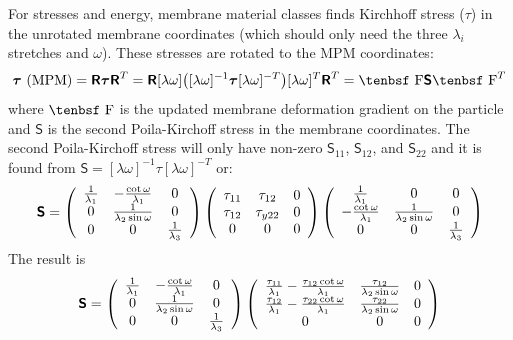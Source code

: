 \documentclass[11pt]{book}
\newcommand{\tens}[1]{\boldsymbol{\mathsf{#1}}}
\def\F{\hbox{\tenbsf F}}
\begin{document}
For stresses and energy, membrane material classes finds Kirchhoff stress ($\tens{\tau}$) in the unrotated membrane coordinates (which should only need the three $\lambda_i$ stretches and $\omega$). These stresses are rotated to the MPM coordinates:
\begin{equation}
    \tens\tau\ ({\rm MPM}) = \tens{R} \tens{\tau} \tens{R}^T =  \tens{R}[\lambda\omega]\bigl([\lambda\omega]^{-1} \tens{\tau}[\lambda\omega]^{-T}\bigr)[\lambda\omega]^T\tens{R}^T =  \F \tens{S} \F^T
\end{equation}
where $\F$ is the updated membrane deformation gradient on the particle and $\tens{S}$ is the second Poila-Kirchoff stress in the membrane coordinates. The second Poila-Kirchoff stress will only have non-zero $\tens{S}_{11}$, $\tens{S}_{12}$, and $\tens{S}_{22}$ and it is found from $\tens{S} =  [\lambda\omega]^{-1} \tens{\tau}[\lambda\omega]^{-T}$ or:
\begin{equation}
   \tens{S} = \left(\begin{array}{ccc}
          {1\over\lambda_1}  & -{ \cot\omega\over \lambda_1} & 0   \\
         0  & {1\over \lambda_2 \sin\omega} & 0   \\
        0 & 0 & {1\over\lambda_3}
        \end{array}\right)\left(\begin{array}{ccc}
          \tau_{11}  & \tau_{12} & 0   \\
         \tau_{12}  & \tau_{y22} & 0   \\
        0 & 0 & 0
        \end{array}\right)\left(\begin{array}{ccc}
          {1\over\lambda_1}  & 0 & 0   \\
         -{ \cot\omega\over \lambda_1}  & {1\over \lambda_2 \sin\omega} & 0   \\
        0 & 0 & {1\over\lambda_3}
        \end{array}\right)
\end{equation}
The result is
\begin{equation}
   \tens{S} = \left(\begin{array}{ccc}
          {1\over\lambda_1}  & -{ \cot\omega\over \lambda_1} & 0   \\
         0  & {1\over \lambda_2 \sin\omega} & 0   \\
        0 & 0 & {1\over\lambda_3}
        \end{array}\right)\left(\begin{array}{ccc}
          {\tau_{11}\over\lambda_1} - {\tau_{12}\cot\omega\over \lambda_1} & {\tau_{12}\over \lambda_2 \sin\omega} & 0   \\
         {\tau_{12}\over\lambda_1} - {\tau_{22}\cot\omega\over \lambda_1}  & {\tau_{22}\over \lambda_2 \sin\omega} & 0   \\
        0 & 0 & 0
        \end{array}\right)
\end{equation}
\end{document}
